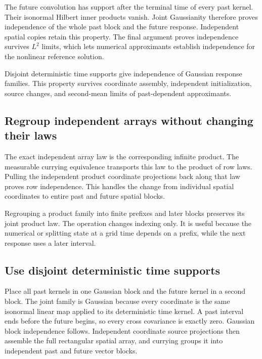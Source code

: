 \documentclass[11pt,a4paper]{report}
\begin{document}
The future convolution has support after the terminal time of every past kernel. Their isonormal Hilbert inner products vanish. Joint Gaussianity therefore proves independence of the whole past block and the future response. Independent spatial copies retain this property. The final argument proves independence survives \(L^{2}\) limits, which lets numerical approximants establish independence for the nonlinear reference solution.



Disjoint deterministic time supports give independence of Gaussian response families. This property survives coordinate assembly, independent initialization, source changes, and second-mean limits of past-dependent approximants.

\subsection{\texorpdfstring{Regroup independent arrays without changing their laws}{Regroup independent arrays without changing their laws}}
\label{report-step-KineticLangevin-PastFutureIndependence-lean-1}


The exact independent array law is the corresponding infinite product. The measurable currying equivalence transports this law to the product of row laws. Pulling the independent product coordinate projections back along that law proves row independence. This handles the change from individual spatial coordinates to entire past and future spatial blocks.



Regrouping a product family into finite prefixes and later blocks preserves its joint product law. The operation changes indexing only. It is useful because the numerical or splitting state at a grid time depends on a prefix, while the next response uses a later interval.

\subsection{\texorpdfstring{Use disjoint deterministic time supports}{Use disjoint deterministic time supports}}
\label{report-step-KineticLangevin-PastFutureIndependence-lean-2}


Place all past kernels in one Gaussian block and the future kernel in a second block. The joint family is Gaussian because every coordinate is the same isonormal linear map applied to its deterministic time kernel. A past interval ends before the future begins, so every cross covariance is exactly zero. Gaussian block independence follows. Independent coordinate source projections then assemble the full rectangular spatial array, and currying groups it into independent past and future vector blocks.
\end{document}
